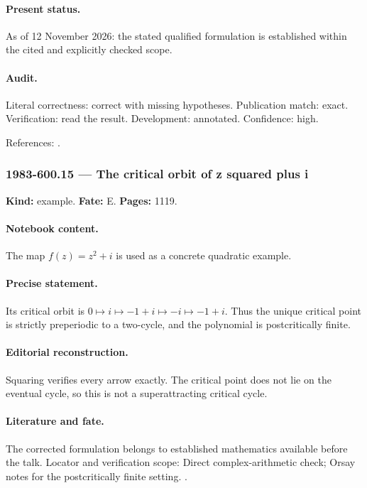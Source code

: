 \paragraph{Present status.} As of 12 November 2026: the stated qualified formulation is established within the cited and explicitly checked scope.

\paragraph{Audit.} Literal correctness: correct with missing hypotheses. Publication match: exact. Verification: read the result. Development: annotated. Confidence: high.

\noindent References: \citep{vinberg1981absence,vinberg1985hyperbolic}.\par

\subsubsection{1983-600.15 --- The critical orbit of z squared plus i}

\label{item:1983-600.15}

\noindent\textbf{Kind:} example. \textbf{Fate:} E. \textbf{Pages:} 1119.\par

\paragraph{Notebook content.} The map \(f(z)=z^2+i\) is used as a concrete quadratic example.

\paragraph{Precise statement.} Its critical orbit is \(0\mapsto i\mapsto-1+i\mapsto-i\mapsto-1+i\). Thus the unique critical point is strictly preperiodic to a two-cycle, and the polynomial is postcritically finite.

\paragraph{Editorial reconstruction.} Squaring verifies every arrow exactly. The critical point does not lie on the eventual cycle, so this is not a superattracting critical cycle.

\paragraph{Literature and fate.} The corrected formulation belongs to established mathematics available before the talk. Locator and verification scope: Direct complex-arithmetic check; Orsay notes for the postcritically finite setting. \cite{douadyhubbard1985polynomes}.

